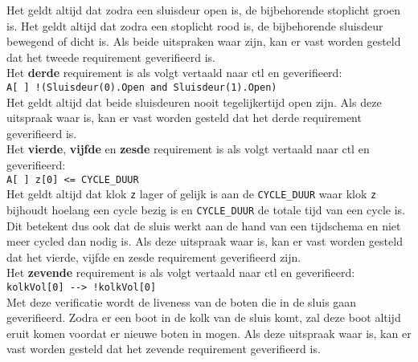 \documentclass[../verslag.tex]{subfiles}
\begin{document}
Het geldt altijd dat zodra een sluisdeur open is, de bijbehorende stoplicht groen is.
Het geldt altijd dat zodra een stoplicht rood is, de bijbehorende sluisdeur bewegend of dicht is.
Als beide uitspraken waar zijn, kan er vast worden gesteld dat het tweede requirement geverifieerd is. \\

Het \textbf{derde} requirement is als volgt vertaald naar ctl en geverifieerd: \\
\verb|A[ ] !(Sluisdeur(0).Open and Sluisdeur(1).Open)| \\

Het geldt altijd dat beide sluisdeuren nooit tegelijkertijd open zijn.
Als deze uitspraak waar is, kan er vast worden gesteld dat het derde requirement geverifieerd is. \\

Het \textbf{vierde}, \textbf{vijfde} en \textbf{zesde} requirement is als volgt vertaald naar ctl en geverifieerd: \\
\verb|A[ ] z[0] <= CYCLE_DUUR| \\

Het geldt altijd dat klok \verb|z| lager of gelijk is aan de \verb|CYCLE_DUUR| waar klok \verb|z| bijhoudt hoelang een cycle bezig is en \verb|CYCLE_DUUR| de totale tijd van een cycle is.
Dit betekent dus ook dat de sluis werkt aan de hand van een tijdschema en niet meer cycled dan nodig is.
Als deze uitspraak waar is, kan er vast worden gesteld dat het vierde, vijfde en zesde requirement geverifieerd zijn. \\

Het \textbf{zevende} requirement is als volgt vertaald naar ctl en geverifieerd: \\
\verb|kolkVol[0] --> !kolkVol[0]| \\

Met deze verificatie wordt de liveness van de boten die in de sluis gaan geverifieerd. Zodra er een boot in de kolk van de sluis komt, zal deze boot altijd eruit komen voordat er nieuwe boten in mogen.
Als deze uitspraak waar is, kan er vast worden gesteld dat het zevende requirement geverifieerd is. \\
\end{document}
